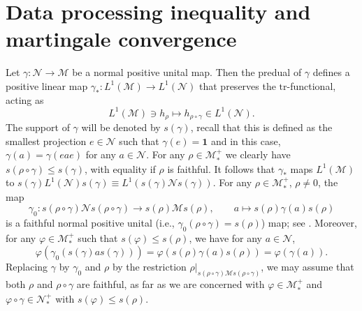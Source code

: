 \documentclass[12pt]{article}
\theoremstyle{definition}
\theoremstyle{remark}
\numberwithin{equation}{section}
\def\Me{\mathcal M}
\def\Ne{\mathcal N}
\def\Tr{\mathrm{tr}}
\def\ffi{\varphi}
\def\1{\mathbf{1}}
\begin{document}
\section{Data processing inequality and martingale convergence}

Let  $\gamma: \Ne\to \Me$ be a normal positive unital map. Then the  predual of $\gamma$  defines a 
positive linear map $\gamma_*: L^1(\Me)\to L^1(\Ne)$ that preserves the {$\Tr$-functional,}
acting as
\[
L^1(\Me)\ni h_\rho\mapsto h_{\rho\circ\gamma} \in L^1(\Ne).
\]
The support
of $\gamma$ will be denoted by $s(\gamma)$, recall that this is defined as the smallest projection
$e\in \Ne$ such that $\gamma(e)=\1$ and in this case, $\gamma(a)=\gamma(eae)$ for any $a\in
\Ne$. For any $\rho\in \Me_*^+$ we clearly have
$s(\rho\circ\gamma)\le s(\gamma)$, with equality if $\rho$ is faithful. 
It follows that $\gamma_*$ maps $L^1(\Me)$ to $s(\gamma)L^1(\Ne)s(\gamma)\equiv
L^1(s(\gamma)\Ne s(\gamma))$.  For any $\rho\in \Me_*^+$, $\rho\ne 0$, the map
\[
\gamma_0: {s(\rho\circ\gamma)\Ne s(\rho\circ\gamma)}\to s(\rho)\Me s(\rho),
\qquad a\mapsto s(\rho) \gamma(a)s(\rho)
\]
is a faithful normal positive unital {(i.e., $\gamma_0(\rho\circ\gamma)=s(\rho)$)} map;
{see \cite[Remark 6.7]{hiai2021lectures}.} Moreover, for any $\ffi\in \Me_*^+$ such that
$s(\ffi)\le s(\rho)$, we have for any $a\in \Ne$,
\[
\ffi(\gamma_0(s(\gamma)as(\gamma)))=\ffi(s(\rho)\gamma(a)s(\rho))={\ffi(\gamma(a)).}
\]
Replacing $\gamma$ by $\gamma_0$ and $\rho$ by the restriction
{$\rho|_{s(\rho\circ\gamma)\Me s(\rho\circ\gamma)}$,} we may  assume that both $\rho$
and $\rho\circ\gamma$ are faithful, {as far as we are concerned with $\ffi\in\Me_*^+$ and
$\ffi\circ\gamma\in\Ne_*^+$ with $s(\ffi)\le s(\rho)$.}
\end{document}
